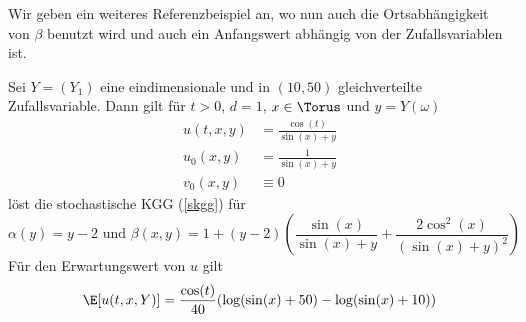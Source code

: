 Wir geben ein weiteres Referenzbeispiel an, wo nun auch die Ortsabhängigkeit von $\beta$ benutzt wird und auch ein Anfangswert abhängig von der Zufallsvariablen ist.
\begin{mathbsp}
Sei $Y=(Y_1)$ eine eindimensionale und in $(10,50)$ gleichverteilte Zufallsvariable. Dann gilt für $t>0$, $d=1$, $x\in\Torus$ und $y=Y(\omega)$
\begin{align*}
u(t,x,y)&=\frac{\cos(t)}{\sin(x) + y}\\
u_0(x,y)&=\frac{1}{\sin(x) + y}\\
v_0(x,y)&\equiv 0
\end{align*}
löst die stochastische KGG (\ref{skgg}) für \[\alpha(y)=y-2\text{  und  }\beta(x,y)=1 + (y-2)\left(\frac{\sin(x)}{\sin(x) + y}+ \frac{2\cos^2(x)}{(\sin(x) + y)^2}\right)\]
Für den Erwartungswert von $u$ gilt
\[\E[u(t,x,Y)]=\frac{\cos(t)}{40}(\log(\sin(x) + 50)- \log(\sin(x) + 10))\]
\end{mathbsp}
